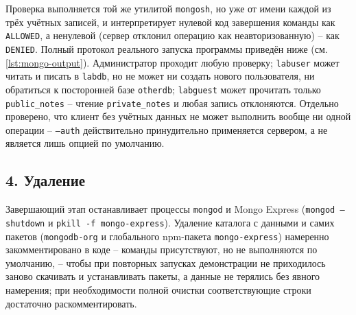 Проверка выполняется той же утилитой \texttt{mongosh}, но уже от имени
каждой из трёх учётных записей, и интерпретирует нулевой код завершения
команды как \texttt{ALLOWED}, а ненулевой (сервер отклонил операцию как
неавторизованную) -- как \texttt{DENIED}. Полный протокол реального
запуска программы приведён ниже (см. \autoref{lst:mongo-output}).
Администратор проходит любую проверку; \texttt{labuser} может читать и
писать в \texttt{labdb}, но не может ни создать нового пользователя, ни
обратиться к посторонней базе \texttt{otherdb}; \texttt{labguest} может
прочитать только \texttt{public\_notes} -- чтение \texttt{private\_notes}
и любая запись отклоняются. Отдельно проверено, что клиент без учётных
данных не может выполнить вообще ни одной операции -- \texttt{--auth}
действительно принудительно применяется сервером, а не является лишь
опцией по умолчанию.


\subsection*{4. Удаление}

Завершающий этап останавливает процессы \texttt{mongod} и Mongo Express
(\texttt{mongod --shutdown} и \texttt{pkill -f mongo-express}). Удаление
каталога с данными и самих пакетов (\texttt{mongodb-org} и глобального
npm-пакета \texttt{mongo-express}) намеренно закомментировано в коде --
команды присутствуют, но не выполняются по умолчанию, -- чтобы при
повторных запусках демонстрации не приходилось заново скачивать и
устанавливать пакеты, а данные не терялись без явного намерения; при
необходимости полной очистки соответствующие строки достаточно
раскомментировать.

